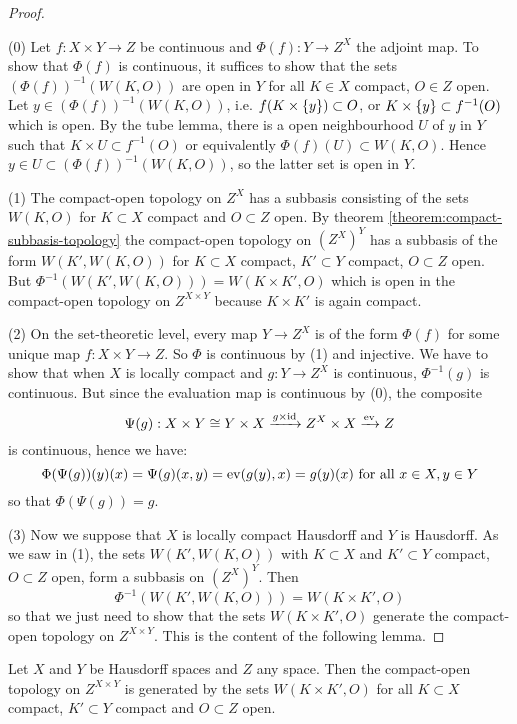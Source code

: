 \begin{proof}\ 

(0) Let $f:X\times Y\to Z$ be continuous and $\Phi(f):Y\to Z^X$ the adjoint map. To show that $\Phi(f)$ is continuous, it suffices to show that the sets $(\Phi(f))^{-1}(W(K,O))$ are open in $Y$ for all $K\in X$ compact, $O\in Z$ open. Let $y\in (\Phi(f))^{-1}(W(K,O))$, i.e. $f(K\times\{y\})\subset O$, or $K\times\{y\}\subset f^{-1}(O)$ which is open. By the tube lemma, there is a open neighbourhood $U$ of $y$ in $Y$ such that $K\times U\subset f^{-1}(O)$ or equivalently $\Phi(f)(U)\subset W(K,O)$. Hence $y\in U\subset(\Phi(f))^{-1}(W(K,O))$, so the latter set is open in $Y$.

(1) The compact-open topology on $Z^X$ has a subbasis consisting of the sets $W(K,O)$ for $K\subset X$ compact and $O\subset Z$ open. By theorem \ref{theorem:compact-subbasis-topology} the compact-open topology on $(Z^X)^Y$ has a subbasis of the form $W(K',W(K,O))$ for $K\subset X$ compact, $K'\subset Y$ compact, $O\subset Z$ open. But $\Phi^{-1}(W(K',W(K,O)))=W(K\times K',O)$ which is open in the compact-open topology on $Z^{X\times Y}$ because $K\times K'$ is again compact.

(2) On the set-theoretic level, every map $Y\to Z^X$ is of the form $\Phi(f)$ for some unique map $f:X\times Y\to Z$. So $\Phi$ is continuous by (1) and injective. We have to show that when $X$ is locally compact and $g:Y\to Z^X$ is continuous, $\Phi^{-1}(g)$ is continuous. But since the evaluation map is continuous by (0), the composite
\[\Psi(g):X\times Y\cong Y\times X\xrightarrow{g\times\operatorname{id}}Z^X\times X\xrightarrow{\operatorname{ev}}Z\]
is continuous, hence we have:
\[\Phi(\Psi(g))(y)(x)=\Psi(g)(x,y)=\operatorname{ev}(g(y),x)=g(y)(x)\text{ for all }x\in X,y\in Y\]
so that $\Phi(\Psi(g))=g$.

(3) Now we suppose that $X$ is locally compact Hausdorff and $Y$ is Hausdorff. As we saw in (1), the sets $W(K',W(K,O))$ with $K\subset X$ and $K'\subset Y$ compact, $O\subset Z$ open, form a subbasis on $(Z^X)^Y$. Then
\[\Phi^{-1}(W(K',W(K,O)))=W(K\times K',O)\]
so that we just need to show that the sets $W(K\times K',O)$ generate the compact-open topology on $Z^{X\times Y}$. This is the content of the following lemma.
\end{proof}

\begin{lemma}
Let $X$ and $Y$ be Hausdorff spaces and $Z$ any space. Then the compact-open topology on $Z^{X\times Y}$ is generated by the sets $W(K\times K',O)$ for all $K\subset X$ compact, $K'\subset Y$ compact and $O\subset Z$ open.
\end{lemma}

